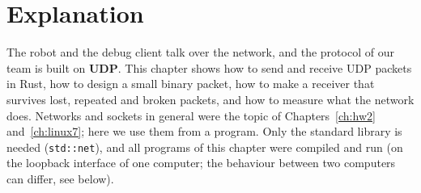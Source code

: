 \label{ch:rust7}

\section*{Explanation}
The robot and the debug client talk over the network, and the protocol of our team is built on \textbf{UDP}. This chapter shows how to send and receive UDP packets in Rust, how to design a small binary packet, how to make a receiver that survives lost, repeated and broken packets, and how to measure what the network does. Networks and sockets in general were the topic of Chapters~\ref{ch:hw2} and~\ref{ch:linux7}; here we use them from a program. Only the standard library is needed (\verb!std::net!), and all programs of this chapter were compiled and run (on the loopback interface of one computer; the behaviour between two computers can differ, see below).

